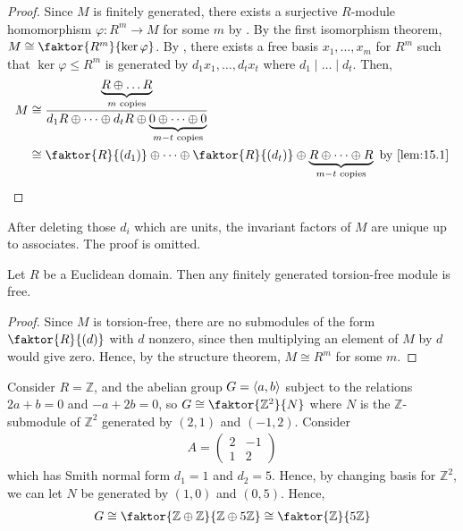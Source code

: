 \begin{proof}
	Since $M$ is finitely generated, there exists a surjective $R$-module homomorphism $\varphi : R^m \to M$ for some $m$ by .
	By the first isomorphism theorem, $M \cong \faktor{R^m}{\ker \varphi}$.
	By , there exists a free basis $x_1, \dots, x_m$ for $R^m$ such that $\ker \varphi \leq R^m$ is generated by $d_1 x_1, \dots, d_t x_t$ where $d_1 \mid \dots \mid d_t$.
	Then,
	\begin{align*}
		M &\cong \frac{\underbrace{R \oplus \dots R}_{m \text{ copies}}}{d_1 R \oplus \dots \oplus d_t R \oplus \underbrace{0 \oplus \dots \oplus 0}_{m-t \text{ copies}}} \\
		&\cong \faktor{R}{(d_1)} \oplus \dots \oplus \faktor{R}{(d_t)} \oplus \underbrace{R \oplus \dots \oplus R}_{m-t \text{ copies}} \text{ by \Cref{lem:15.1}}
	\end{align*}
\end{proof}

\begin{remark}
	After deleting those $d_i$ which are units, the invariant factors of $M$ are unique up to associates.
	The proof is omitted.
\end{remark}

\begin{corollary} \label{cor:16.5}
	Let $R$ be a Euclidean domain.
	Then any finitely generated torsion-free module is free.
\end{corollary}

\begin{proof}
	Since $M$ is torsion-free, there are no submodules of the form $\faktor{R}{(d)}$ with $d$ nonzero, since then multiplying an element of $M$ by $d$ would give zero.
	Hence, by the structure theorem, $M \cong R^m$ for some $m$.
\end{proof}

\begin{example}
	Consider $R = \mathbb Z$, and the abelian group $G = \left\langle{} a,b \right\rangle$ subject to the relations $2a + b = 0$ and $-a + 2b = 0$, so $G \cong \faktor{\mathbb Z^2}{N}$ where $N$ is the $\mathbb Z$-submodule of $\mathbb Z^2$ generated by $(2,1)$ and $(-1,2)$.
	Consider
	\begin{align*}
		A = \begin{pmatrix}
			2 & -1 \\
			1 & 2
		\end{pmatrix}
	\end{align*}
	which has Smith normal form $d_1 = 1$ and $d_2 = 5$.
	Hence, by changing basis for $\mathbb Z^2$, we can let $N$ be generated by $(1,0)$ and $(0,5)$.
	Hence,
	\begin{align*}
		G \cong \faktor{\mathbb Z \oplus \mathbb Z}{\mathbb Z \oplus 5 \mathbb Z} \cong \faktor{\mathbb Z}{5\mathbb Z}
	\end{align*}
\end{example}

